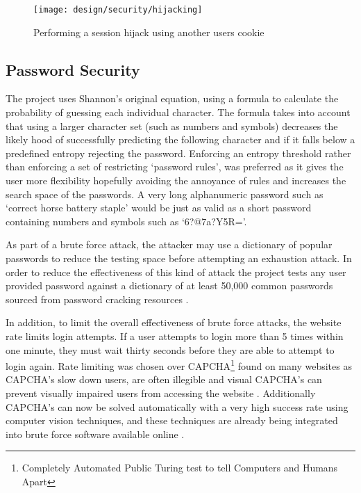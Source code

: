 \begin{figure}[h]
    \centering
    \texttt{[image: design/security/hijacking]}
    \caption[Performing a session hijack using another users cookie]{Performing a session hijack using another users cookie \parencite{owasp2011sessionhihacking}}
    \label{fig:securityhijacking}
\end{figure}

\subsection{Password Security}
 
The project uses Shannon's original equation, using a formula to calculate the probability of guessing each individual character. The formula takes into account that using a larger character set (such as numbers and symbols) decreases the likely hood of successfully predicting the following character and if it falls below a predefined entropy rejecting the password.
%
Enforcing an entropy threshold rather than enforcing a set of restricting `password rules', was preferred as it gives the user more flexibility hopefully avoiding the annoyance of rules and increases the search space of the passwords. A very long alphanumeric password such as `correct horse battery staple' would be just as valid as a short password containing numbers and symbols such as `6?@7a?Y5R='.

As part of a brute force attack, the attacker may use a dictionary of popular passwords to reduce the testing space before attempting an exhaustion attack.
%
In order to reduce the effectiveness of this kind of attack the project tests any user provided password against a dictionary of at least 50,000 common passwords sourced from password cracking resources \cite{burr2013electronic}.

In addition, to limit the overall effectiveness of brute force attacks, the website rate limits login attempts. If a user attempts to login more than 5 times within one minute, they must wait thirty seconds before they are able to attempt to login again.
%
Rate limiting was chosen over CAPCHA\footnote{Completely Automated Public Turing test to tell Computers and Humans Apart} found on many websites as CAPCHA's slow down users, are often illegible and visual CAPCHA's can prevent visually impaired users from accessing the website \parencite{matt2005inaccessibility, hegarty2012onlinesecurity}. Additionally CAPCHA's can now be solved automatically with a very high success rate using computer vision techniques, and these techniques are already being integrated into brute force software available online \parencite{goodfellow2013neuralnetwork, 9kweu2014captchasolver, danchev2014captcha, savinkin2012captchasolvers}. 

